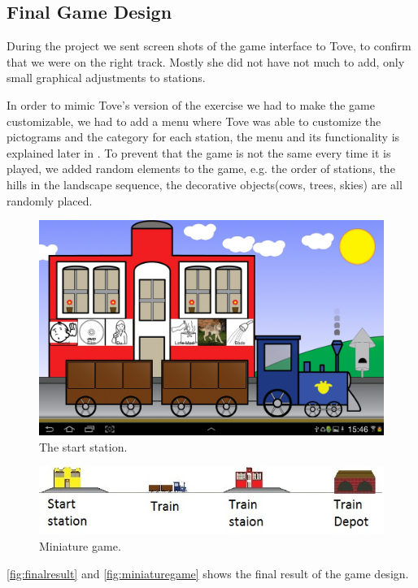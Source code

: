 \subsection{Final Game Design}
\label{designgameinterface}
During the project we sent screen shots of the game interface to Tove, to confirm that we were on the right track. Mostly she did not have not much to add, only small graphical adjustments to stations.

In order to mimic Tove's version of the exercise we had to make the game customizable, we had to add a menu where Tove was able to customize the pictograms and the category for each station, the menu and its functionality is explained later in . To prevent that the game is not the same every time it is played, we added random elements to the game, e.g. the order of stations, the hills in the landscape sequence, the decorative objects(cows, trees, skies) are all randomly placed.
\begin{figure}[H]
\centering
\includegraphics[width=0.9\linewidth]{img/screenshots/gamedesign1.jpg}%
\caption{The start station.}
\label{fig:finalresult}
\end{figure}
\begin{figure}[H]
\centering
\includegraphics[width=1.0\linewidth]{img/screenshots/stations.jpg}
\caption{Miniature game.}
\label{fig:miniaturegame}
\end{figure}
\autoref{fig:finalresult} and \autoref{fig:miniaturegame} shows the final result of the game design.
